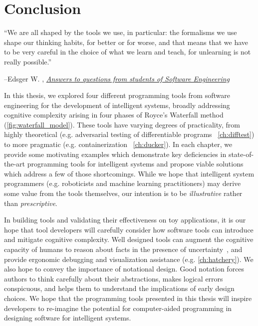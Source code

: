 \chapter{Conclusion}\label{ch:conclusion}
\setlength{\epigraphwidth}{0.90\textwidth}
\epigraph{``We are all shaped by the tools we use, in particular: the formalisms we use shape our thinking habits, for better or for worse, and that means that we have to be very careful in the choice of what we learn and teach, for unlearning is not really possible.''}{\begin{flushright}--Edsger W. \citet{dijkstra2000answers}, \href{https://www.cs.utexas.edu/~EWD/transcriptions/EWD13xx/EWD1305.html}{\textit{Answers to questions from students of Software Engineering}}\end{flushright}}

In this thesis, we explored four different programming tools from software engineering for the development of intelligent systems, broadly addressing cognitive complexity arising in four phases of Royce's Waterfall method (\autoref{fig:waterfall_model}). These tools have varying degrees of practicality, from highly theoretical (e.g. adversarial testing of differentiable programs ~\autoref{ch:difftest}) to more pragmatic (e.g. containerization ~\autoref{ch:ducker}). In each chapter, we provide some motivating examples which demonstrate key deficiencies in state-of-the-art programming tools for intelligent systems and propose viable solutions which address a few of those shortcomings. While we hope that intelligent system programmers (e.g. roboticists and machine learning practitioners) may derive some value from the tools themselves, our intention is to be \textit{illustrative} rather than \textit{prescriptive}.

In building tools and validating their effectiveness on toy applications, it is our hope that tool developers will carefully consider how software tools can introduce and mitigate cognitive complexity. Well designed tools can augment the cognitive capacity of humans to reason about facts in the presence of uncertainty~\citep{famelis2012partial}, and provide ergonomic debugging and visualization assistance (e.g. \autoref{ch:hatchery}). We also hope to convey the importance of notational design. Good notation forces authors to think carefully about their abstractions, makes logical errors conspicuous, and helps them to understand the implications of early design choices. We hope that the programming tools presented in this thesis will inspire developers to re-imagine the potential for computer-aided programming in designing software for intelligent systems.

